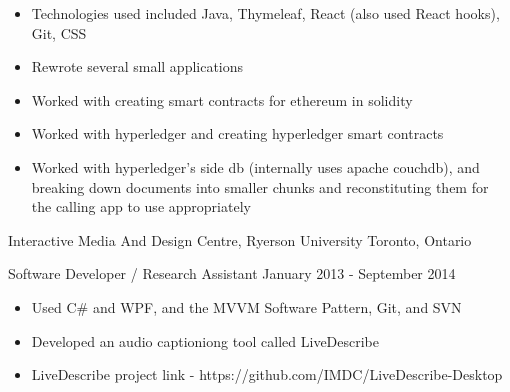 \begin{cventries}
{{\begin{cvitems}
{                    }
                    \item[] {
                        \begin{itemize}
                            \item {Technologies used included Java, Thymeleaf, React (also used React hooks), Git, CSS}
                            \item {Rewrote several small applications}
                        \end{itemize}
                    }
                    \item[] {
                        \begin{itemize}
                            \item {Worked with creating smart contracts for ethereum in solidity}
                            \item {Worked with hyperledger and creating hyperledger smart contracts}
                            \item {Worked with hyperledger's side db (internally uses apache couchdb),
                                and breaking down documents into smaller chunks and reconstituting them for the calling app to use appropriately}
                        \end{itemize}
                    }
                \end{cvitems}
            }
    }

    \cventry
    {Interactive Media And Design Centre, Ryerson University}
    {Toronto, Ontario}
    {
        \cvposition
        {Software Developer / Research Assistant}
        {January 2013 - September 2014}
        {
            \renewcommand{\labelitemii}{\bullet}
            \begin{cvitems}
                \item[] {
                    \begin{itemize}
                        \item {Used C\# and WPF, and the MVVM Software Pattern, Git, and SVN}
                        \item {Developed an audio captioniong tool called LiveDescribe}
                        \item {LiveDescribe project link - https://github.com/IMDC/LiveDescribe-Desktop}
                    \end{itemize}
                }
            \end{cvitems}
        }
    }
\end{cventries}
